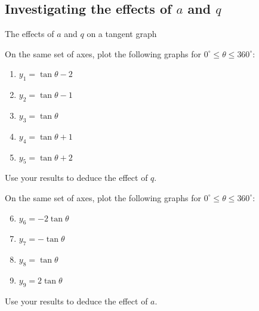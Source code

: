 \subsection*{Investigating the effects of $a$ and $q$}
\begin{Investigation}{The effects of $a$ and $q$ on a tangent graph}
{On the same set of axes, plot the following graphs for $0^{\circ}\leq\theta\leq360^{\circ}$:
\begin{enumerate}[noitemsep, label=\textbf{\arabic*}. ] 
\item $y_1=\tan\theta -2$
\item $y_2=\tan\theta -1$
\item $y_3=\tan\theta $
\item $y_4=\tan\theta +1$
\item $y_5=\tan\theta +2$
\end{enumerate}

Use your results to deduce the effect of $q$.\\
\par
On the same set of axes, plot the following graphs for
$0^{\circ} \leq \theta \leq 360^{\circ}$:
\begin{enumerate}[noitemsep, label=\textbf{\arabic*}. ] \setcounter{enumi}{5}
\item $y_6=-2\tan\theta $
\item $y_7=-\tan\theta $
\item $y_8=\tan\theta $
\item $y_9=2\tan\theta $
\end{enumerate}
Use your results to deduce the effect of $a$.
}
\end{Investigation}


